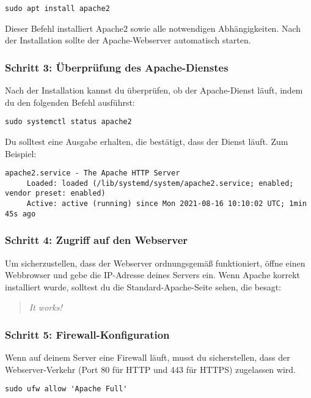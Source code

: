 \documentclass[a4paper,12pt]{article}
\begin{document}
\begin{lstlisting}
sudo apt install apache2
\end{lstlisting}

Dieser Befehl installiert Apache2 sowie alle notwendigen Abhängigkeiten. Nach der Installation sollte der Apache-Webserver automatisch starten.

\subsubsection{Schritt 3: Überprüfung des Apache-Dienstes}
Nach der Installation kannst du überprüfen, ob der Apache-Dienst läuft, indem du den folgenden Befehl ausführst:

\begin{lstlisting}
sudo systemctl status apache2
\end{lstlisting}

Du solltest eine Ausgabe erhalten, die bestätigt, dass der Dienst läuft. Zum Beispiel:

\begin{lstlisting}
apache2.service - The Apache HTTP Server
     Loaded: loaded (/lib/systemd/system/apache2.service; enabled; vendor preset: enabled)
     Active: active (running) since Mon 2021-08-16 10:10:02 UTC; 1min 45s ago
\end{lstlisting}

\subsubsection{Schritt 4: Zugriff auf den Webserver}
Um sicherzustellen, dass der Webserver ordnungsgemäß funktioniert, öffne einen Webbrowser und gebe die IP-Adresse deines Servers ein. Wenn Apache korrekt installiert wurde, solltest du die Standard-Apache-Seite sehen, die besagt:

\begin{quote}
    \textit{It works!}
\end{quote}

\subsubsection{Schritt 5: Firewall-Konfiguration}
Wenn auf deinem Server eine Firewall läuft, musst du sicherstellen, dass der Webserver-Verkehr (Port 80 für HTTP und 443 für HTTPS) zugelassen wird.

\begin{lstlisting}
sudo ufw allow 'Apache Full'
\end{lstlisting}
\end{document}
